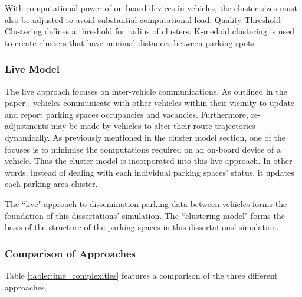 With computational power of on-board devices in vehicles, the cluster sizes must also be adjusted to avoid substantial computational load. Quality Threshold Clustering defines a threshold for radius of clusters. K-medoid clustering is used to create clusters that have minimal distances between parking spots.

\subsubsection{Live Model}\label{sssec:live}
The live approach focuses on inter-vehicle communications. As outlined in the paper \citep{Verroios2011ReachingNetworking}, vehicles communicate with other vehicles within their vicinity to update and report parking spaces occupancies and vacancies. Furthermore, re-adjustments may be made by vehicles to alter their route trajectories dynamically. As previously mentioned in the cluster model section, one of the focuses is to minimise the computations required on an on-board device of a vehicle. Thus the cluster model is incorporated into this live approach. In other words, instead of dealing with each individual parking spaces' status, it updates each parking area cluster.

The ``live" approach to dissemination parking data between vehicles forms the foundation of this dissertations' simulation. The ``clustering model" forms the basis of the structure of the parking spaces in this dissertations' simulation.

\subsubsection*{Comparison of Approaches}
Table \ref{table:time_complexities} features a comparison of the three different approaches. 

